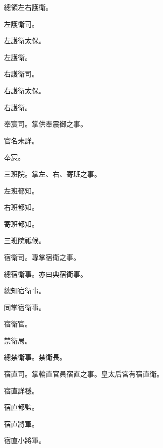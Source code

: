 \begin{pinyinscope}
 總領左右護衛。



 左護衛司。



 左護衛太保。



 左護衛。



 右護衛司。



 右護衛太保。



 右護衛。



 奉宸司。掌供奉震御之事。



 官名未詳。



 奉宸。



 三班院。掌左、右、寄班之事。



 左班都知。



 右班都知。



 寄班都知。



 三班院祗候。



 宿衛司。專掌宿衛之事。



 總宿衛事。亦曰典宿衛事。



 總知宿衛事。



 同掌宿衛事。



 宿衛官。



 禁衛局。



 總禁衛事。禁衛長。



 宿直司。掌輪直官員宿直之事。皇太后宮有宿直衛。



 宿直詳穩。



 宿直都監。



 宿直將軍。



 宿直小將軍。




\end{pinyinscope}

